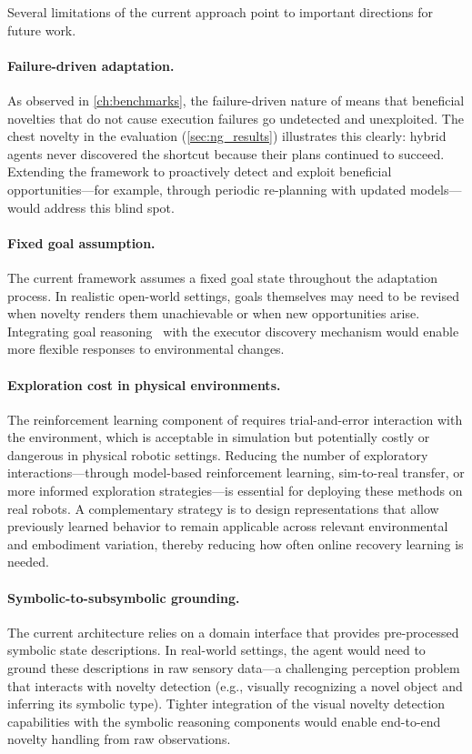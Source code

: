 Several limitations of the current approach point to important directions for future work.

\paragraph{Failure-driven adaptation.} As observed in \cref{ch:benchmarks}, the failure-driven nature of \RAPidLearn{} means that beneficial novelties that do not cause execution failures go undetected and unexploited. The chest novelty in the \NovelGym{} evaluation (\cref{sec:ng_results}) illustrates this clearly: hybrid agents never discovered the shortcut because their plans continued to succeed. Extending the framework to proactively detect and exploit beneficial opportunities---for example, through periodic re-planning with updated models---would address this blind spot.

\paragraph{Fixed goal assumption.} The current framework assumes a fixed goal state throughout the adaptation process. In realistic open-world settings, goals themselves may need to be revised when novelty renders them unachievable or when new opportunities arise. Integrating goal reasoning~\citep{aha2018goalreasoning} with the executor discovery mechanism would enable more flexible responses to environmental changes.

\paragraph{Exploration cost in physical environments.} The reinforcement learning component of \RAPidLearn{} requires trial-and-error interaction with the environment, which is acceptable in simulation but potentially costly or dangerous in physical robotic settings. Reducing the number of exploratory interactions---through model-based reinforcement learning, sim-to-real transfer, or more informed exploration strategies---is essential for deploying these methods on real robots. A complementary strategy is to design representations that allow previously learned behavior to remain applicable across relevant environmental and embodiment variation, thereby reducing how often online recovery learning is needed.

\paragraph{Symbolic-to-subsymbolic grounding.} The current architecture relies on a domain interface that provides pre-processed symbolic state descriptions. In real-world settings, the agent would need to ground these descriptions in raw sensory data---a challenging perception problem that interacts with novelty detection (e.g., visually recognizing a novel object and inferring its symbolic type). Tighter integration of the visual novelty detection capabilities with the symbolic reasoning components would enable end-to-end novelty handling from raw observations.

